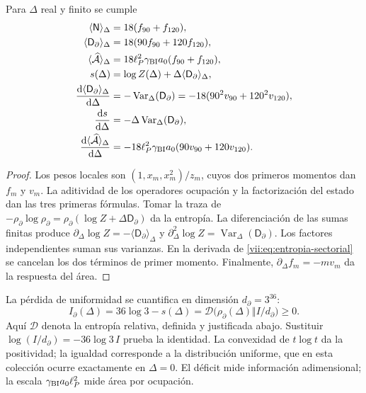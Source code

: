\begin{proposition}
\label{vii:prop:respuesta-sectorial}
Para \(\Delta\) real y finito se cumple
\begin{align}
 \langle\mathsf N\rangle_\Delta&=18(f_{90}+f_{120}),\\
 \langle\mathsf D_\partial\rangle_\Delta&=18(90f_{90}+120f_{120}),\\
 \langle\widehat{\mathcal A}\rangle_\Delta
 &=18\ell_P^2\gamma_{\rm BI}a_0(f_{90}+f_{120}),\\
 s(\Delta)&=\log Z(\Delta)+\Delta\langle\mathsf D_\partial\rangle_\Delta,
 \label{vii:eq:entropia-sectorial}\\
 \frac{\mathrm d\langle\mathsf D_\partial\rangle_\Delta}{\mathrm d\Delta}
 &=-\operatorname{Var}_\Delta(\mathsf D_\partial)
  =-18(90^2v_{90}+120^2v_{120}),\\
 \frac{\mathrm ds}{\mathrm d\Delta}
 &=-\Delta\operatorname{Var}_\Delta(\mathsf D_\partial),\\
 \frac{\mathrm d\langle\widehat{\mathcal A}\rangle_\Delta}{\mathrm d\Delta}
 &=-18\ell_P^2\gamma_{\rm BI}a_0(90v_{90}+120v_{120}).
 \label{vii:eq:respuestas-area-entropia}
\end{align}
\end{proposition}
\begin{proof}
Los pesos locales son \((1,x_m,x_m^2)/z_m\), cuyos dos primeros
momentos dan \(f_m\) y \(v_m\). La aditividad de los operadores
ocupación y la factorización del estado dan las tres primeras fórmulas.
Tomar la traza de
\(-\rho_\partial\log\rho_\partial
=\rho_\partial(\log Z+\Delta\mathsf D_\partial)\)
da la entropía. La diferenciación de las sumas finitas produce
\(\partial_\Delta\log Z=-\langle\mathsf D_\partial\rangle_\Delta\)
y \(\partial_\Delta^2\log Z
=\operatorname{Var}_\Delta(\mathsf D_\partial)\).
Los factores independientes suman sus varianzas. En la derivada de
\eqref{vii:eq:entropia-sectorial} se cancelan los dos términos de
primer momento. Finalmente, \(\partial_\Delta f_m=-mv_m\)
da la respuesta del área.
\end{proof}

La pérdida de uniformidad se cuantifica en dimensión \(d_\partial=3^{36}\):
\begin{equation}
 I_\partial(\Delta)
 =36\log3-s(\Delta)
 =\mathcal D\bigl(\rho_\partial(\Delta)\Vert I/d_\partial\bigr)\ge0.
 \label{vii:eq:deficit-informacional}
\end{equation}
Aquí \(\mathcal D\) denota la entropía relativa, definida y justificada
abajo. Sustituir \(\log(I/d_\partial)=-36\log3\,I\) prueba la
identidad. La convexidad de \(t\log t\) da la positividad; la igualdad
corresponde a la distribución uniforme, que en esta colección ocurre
exactamente en \(\Delta=0\). El déficit mide información adimensional;
la escala \(\gamma_{\rm BI}a_0\ell_P^2\) mide área por ocupación.

